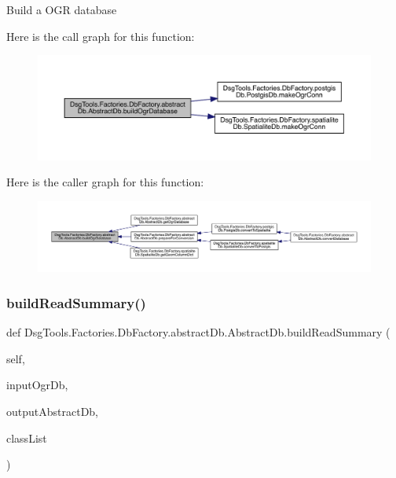 \begin{DoxyVerb}Build a OGR database
\end{DoxyVerb}
 Here is the call graph for this function\+:
\nopagebreak
\begin{figure}[H]
\begin{center}
\leavevmode
\includegraphics[width=350pt]{class_dsg_tools_1_1_factories_1_1_db_factory_1_1abstract_db_1_1_abstract_db_ac38d68fbcc40e5bcc3fd95aec02ce76d_cgraph}
\end{center}
\end{figure}
Here is the caller graph for this function\+:
\nopagebreak
\begin{figure}[H]
\begin{center}
\leavevmode
\includegraphics[width=350pt]{class_dsg_tools_1_1_factories_1_1_db_factory_1_1abstract_db_1_1_abstract_db_ac38d68fbcc40e5bcc3fd95aec02ce76d_icgraph}
\end{center}
\end{figure}
\mbox{\label{class_dsg_tools_1_1_factories_1_1_db_factory_1_1abstract_db_1_1_abstract_db_a6041b5680c46ff5954a5f6d113aa16ba}} 
\subsubsection{\texorpdfstring{build\+Read\+Summary()}{buildReadSummary()}}
{\footnotesize\ttfamily def Dsg\+Tools.\+Factories.\+Db\+Factory.\+abstract\+Db.\+Abstract\+Db.\+build\+Read\+Summary (\begin{DoxyParamCaption}\item[{}]{self,  }\item[{}]{input\+Ogr\+Db,  }\item[{}]{output\+Abstract\+Db,  }\item[{}]{class\+List }\end{DoxyParamCaption})}

